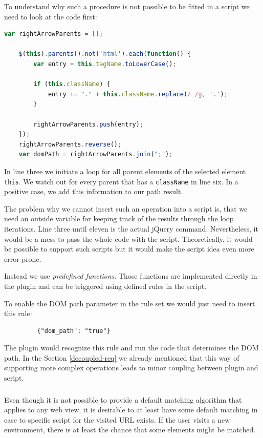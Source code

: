 To understand why such a procedure is not possible to be fitted in a script we need to look at the code first:

\begin{lstlisting}[language=JavaScript]
    var rightArrowParents = [];

    $(this).parents().not('html').each(function() {
        var entry = this.tagName.toLowerCase();

        if (this.className) {
            entry += "." + this.className.replace(/ /g, '.');
        }

        rightArrowParents.push(entry);
    });
    rightArrowParents.reverse();    
    var domPath = rightArrowParents.join(";");
\end{lstlisting}

In line three we initiate a loop for all parent elements of the selected element \verb^this^. We watch out for every parent that has a \verb^className^ in line six. In a positive case, we add this information to our path result. 

The problem why we cannot insert such an operation into a script is, that we need an outside variable for keeping track of the results through the loop iterations. Line three until eleven is the actual jQuery command. Nevertheless, it would be a mess to pass the whole code with the script. Theoretically, it would be possible to support such scripts but it would make the script idea even more error prone. 

Instead we use \emph{predefined functions}. Those functions are implemented directly in the plugin and can be triggered using defined rules in the script. 

To enable the DOM path parameter in the rule set we would just need to insert this rule:
\begin{lstlisting}
         {"dom_path": "true"}
\end{lstlisting}
The plugin would recognize this rule and run the code that determines the DOM path. In the Section \ref{decoupled-req} we already mentioned that this way of supporting more complex operations leads to minor coupling between plugin and script. 

\subsubsection[Default Matching Procedure]{\reqSv}\label{reqSv}

Even though it is not possible to provide a default matching algorithm that applies to any web view, it is desirable to at least have some default matching in case to specific script for the visited URL exists. If the user visits a new environment, there is at least the chance that some elements might be matched.

